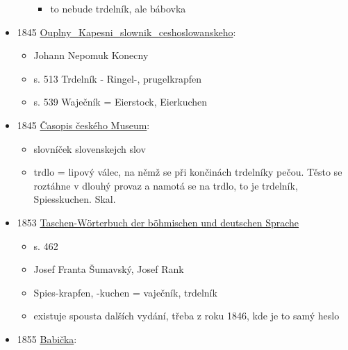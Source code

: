 \begin{itemize}
\begin{itemize}
    \begin{itemize}
    \tightlist
    \item
      to nebude trdelník, ale bábovka
    \end{itemize}
  \end{itemize}
\item
  1845
  \href{https://www.google.cz/books/edition/Ouplny_Kapesni_slownik_ceshoslowanskeho/i8dUAAAAcAAJ?hl=cs&gbpv=1&dq=trdeln\%C3\%ADk&pg=PA513&printsec=frontcover}{Ouplny\_Kapesni\_slownik\_ceshoslowanskeho}:

  \begin{itemize}
  \tightlist
  \item
    Johann Nepomuk Konecny
  \item
    s. 513 Trdelník - Ringel-, prugelkrapfen
  \item
    s. 539 Waječník = Eierstock, Eierkuchen
  \end{itemize}
\item
  1845
  \href{https://ceskadigitalniknihovna.cz/view/uuid:f683dda0-81be-11de-9a7b-000d606f5dc6?page=uuid:5a5cbb90-7ff7-11de-8619-000d606f5dc6&fulltext=trdeln\%C3\%ADk\%20OR\%20trdeln\%C3\%ADky\%20OR\%20trdeln\%C3\%ADku\%20&source=cbvk}{Časopis
  českého Museum}:

  \begin{itemize}
  \tightlist
  \item
    slovníček slovenskejch slov
  \item
    trdlo = lipový válec, na němž se při končinách trdelníky pečou.
    Těsto se roztáhne v dlouhý provaz a namotá se na trdlo, to je
    trdelník, Spiesskuchen. Skal.
  \end{itemize}
\item
  1853
  \href{https://www.google.cz/books/edition/Taschen_W\%C3\%B6rterbuch_der_b\%C3\%B6hmischen_und/tDlFAAAAYAAJ?hl=cs&gbpv=1&dq=trdeln\%C3\%ADk&pg=PA462&printsec=frontcover}{Taschen-Wörterbuch
  der böhmischen und deutschen Sprache}

  \begin{itemize}
  \tightlist
  \item
    s. 462
  \item
    Josef Franta Šumavský, Josef Rank
  \item
    Spies-krapfen, -kuchen = vaječník, trdelník
  \item
    existuje spousta dalších vydání, třeba z roku 1846, kde je to samý
    heslo
  \end{itemize}
\item
  1855
  \href{https://ceskadigitalniknihovna.cz/uuid/uuid:2f58bcf0-f6ae-11dd-8224-000d606f5dc6}{Babička}:


\end{itemize}
